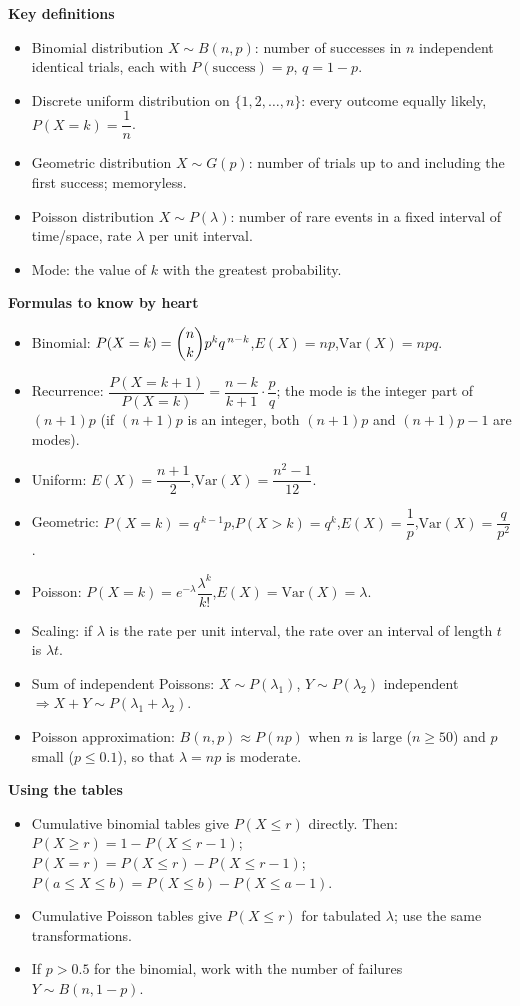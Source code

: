 \documentclass[11pt]{article}
\newcommand{\cle}[1]{{\popxbold\color{popdark}#1}}
\begin{document}
\begin{bilan}
\textbf{Key definitions}
\begin{itemize}
\item \cle{Binomial distribution} $X\sim B(n,p)$: number of successes in $n$ independent identical trials, each with $P(\text{success})=p$, $q=1-p$.
\item \cle{Discrete uniform distribution} on $\{1,2,\dots,n\}$: every outcome equally likely, $P(X=k)=\dfrac{1}{n}$.
\item \cle{Geometric distribution} $X\sim G(p)$: number of trials up to and including the first success; memoryless.
\item \cle{Poisson distribution} $X\sim P(\lambda)$: number of rare events in a fixed interval of time/space, rate $\lambda$ per unit interval.
\item \cle{Mode}: the value of $k$ with the greatest probability.
\end{itemize}

\textbf{Formulas to know by heart}
\begin{itemize}
\item Binomial: $P(X=k)=\dbinom{n}{k}p^{k}q^{\,n-k}$,\quad $E(X)=np$,\quad $\mathrm{Var}(X)=npq$.
\item Recurrence: $\dfrac{P(X=k+1)}{P(X=k)}=\dfrac{n-k}{k+1}\cdot\dfrac{p}{q}$; the mode is the integer part of $(n+1)p$ (if $(n+1)p$ is an integer, both $(n+1)p$ and $(n+1)p-1$ are modes).
\item Uniform: $E(X)=\dfrac{n+1}{2}$,\quad $\mathrm{Var}(X)=\dfrac{n^{2}-1}{12}$.
\item Geometric: $P(X=k)=q^{\,k-1}p$,\quad $P(X>k)=q^{k}$,\quad $E(X)=\dfrac{1}{p}$,\quad $\mathrm{Var}(X)=\dfrac{q}{p^{2}}$.
\item Poisson: $P(X=k)=e^{-\lambda}\dfrac{\lambda^{k}}{k!}$,\quad $E(X)=\mathrm{Var}(X)=\lambda$.
\item Scaling: if $\lambda$ is the rate per unit interval, the rate over an interval of length $t$ is $\lambda t$.
\item Sum of independent Poissons: $X\sim P(\lambda_1)$, $Y\sim P(\lambda_2)$ independent $\Rightarrow X+Y\sim P(\lambda_1+\lambda_2)$.
\item Poisson approximation: $B(n,p)\approx P(np)$ when $n$ is large ($n\ge 50$) and $p$ small ($p\le 0.1$), so that $\lambda=np$ is moderate.
\end{itemize}

\textbf{Using the tables}
\begin{itemize}
\item Cumulative binomial tables give $P(X\le r)$ directly. Then:
$P(X\ge r)=1-P(X\le r-1)$;\quad $P(X=r)=P(X\le r)-P(X\le r-1)$;\quad $P(a\le X\le b)=P(X\le b)-P(X\le a-1)$.
\item Cumulative Poisson tables give $P(X\le r)$ for tabulated $\lambda$; use the same transformations.
\item If $p>0.5$ for the binomial, work with the number of failures $Y\sim B(n,1-p)$.
\end{itemize}


\end{bilan}
\end{document}
